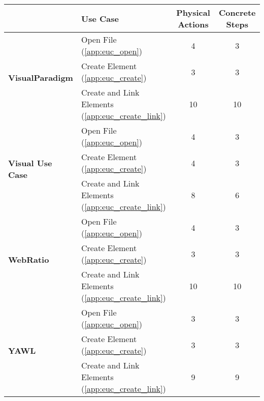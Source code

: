 \begin{table*}[!htb]\centering
{}
\begin{tabularx}{\textwidth}{lXcc}\toprule
 & \textbf{Use Case} & \textbf{Physical Actions} & \textbf{Concrete Steps}\\
\midrule
\multirow{3}{*}{\textbf{VisualParadigm}}
& Open File (\ref{app:euc_open})                       & 4 & 3 \\
& Create Element (\ref{app:euc_create})                & 3 & 3 \\
& Create and Link Elements (\ref{app:euc_create_link}) & 10 & 10 \\
\midrule
\multirow{3}{*}{\textbf{Visual Use Case}}
& Open File (\ref{app:euc_open})                       & 4 & 3 \\
& Create Element (\ref{app:euc_create})                & 4 & 3 \\
& Create and Link Elements (\ref{app:euc_create_link}) & 8 & 6 \\
\midrule
\multirow{3}{*}{\textbf{WebRatio}}
& Open File (\ref{app:euc_open})                       & 4 & 3 \\
& Create Element (\ref{app:euc_create})                & 3 & 3 \\
& Create and Link Elements (\ref{app:euc_create_link}) & 10 & 10 \\
\midrule
\multirow{3}{*}{\textbf{YAWL}}
& Open File (\ref{app:euc_open})                       & 3 & 3 \\
& Create Element (\ref{app:euc_create})                & 3 & 3 \\
& Create and Link Elements (\ref{app:euc_create_link}) & 9 & 9 \\
\bottomrule
\end{tabularx}
\end{table*}
